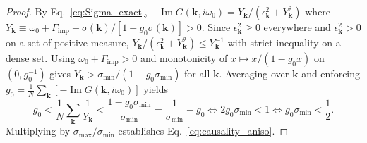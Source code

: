 \documentclass[11pt,a4paper]{article}
\numberwithin{equation}{section}
\theoremstyle{plain}
\theoremstyle{definition}
\providecommand{\vk}{\mathbf{k}}
\providecommand{\im}{\operatorname{Im}}
\begin{document}
\begin{proof}
By Eq.~\eqref{eq:Sigma_exact},
$-\im G(\vk,i\omega_0) = Y_{\vk}/(\epsilon_{\vk}^2 + Y_{\vk}^2)$ where
$Y_{\vk} \equiv \omega_0 + \Gamma_{\mathrm{imp}} + \sigma(\vk)/[1 - g_0\sigma(\vk)] > 0$.
Since $\epsilon_{\vk}^2 \ge 0$ everywhere and $\epsilon_{\vk}^2 > 0$ on a set of
positive measure, $Y_{\vk}/(\epsilon_{\vk}^2 + Y_{\vk}^2) \le Y_{\vk}^{-1}$ with strict
inequality on a dense set. Using $\omega_0 + \Gamma_{\mathrm{imp}} > 0$ and monotonicity
of $x \mapsto x/(1 - g_0 x)$ on $(0, g_0^{-1})$ gives
$Y_{\vk} > \sigma_{\min}/(1 - g_0\sigma_{\min})$ for all $\vk$. Averaging over $\vk$
and enforcing $g_0 = \frac{1}{N}\sum_{\vk}[-\im G(\vk,i\omega_0)]$ yields
\begin{equation}
    g_0 < \frac{1}{N}\sum_{\vk}\frac{1}{Y_{\vk}}
        < \frac{1 - g_0\sigma_{\min}}{\sigma_{\min}}
        = \frac{1}{\sigma_{\min}} - g_0
    \iff 2 g_0 \sigma_{\min} < 1
    \iff g_0 \sigma_{\min} < \frac{1}{2}.
\end{equation}
Multiplying by $\sigma_{\max}/\sigma_{\min}$ establishes Eq.~\eqref{eq:causality_aniso}.
\end{proof}
\end{document}
